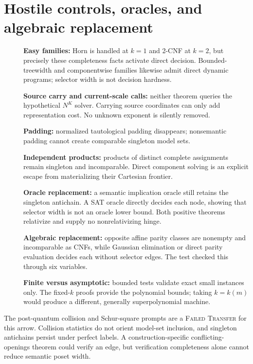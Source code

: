 \documentclass[11pt]{article}
\begin{document}
\section{Hostile controls, oracles, and algebraic replacement}
\begin{description}
\item[] \textbf{Easy families:} Horn is handled at $k=1$ and 2-CNF at
$k=2$, but precisely these completeness facts activate direct decision.
Bounded-treewidth and componentwise families likewise admit direct dynamic
programs; selector width is not decision hardness.
\item[] \textbf{Source carry and current-scale calls:} neither theorem
queries the hypothetical $N^K$ solver.  Carrying source coordinates can only
add representation cost.  No unknown exponent is silently removed.
\item[] \textbf{Padding:} normalized tautological padding disappears;
nonsemantic padding cannot create comparable singleton model sets.
\item[] \textbf{Independent products:} products of distinct complete
assignments remain singleton and incomparable.  Direct component solving is
an explicit escape from materializing their Cartesian frontier.
\item[] \textbf{Oracle replacement:} a semantic implication oracle still
retains the singleton antichain.  A SAT oracle directly decides each node,
showing that selector width is not an oracle lower bound.  Both positive
theorems relativize and supply no nonrelativizing hinge.
\item[] \textbf{Algebraic replacement:} opposite affine parity classes are
nonempty and incomparable as CNFs, while Gaussian elimination or direct
parity evaluation decides each without selector edges.  The test checked
this through six variables.
\item[] \textbf{Finite versus asymptotic:} bounded tests validate exact
small instances only.  The fixed-$k$ proofs provide the polynomial bounds;
taking $k=k(m)$ would produce a different, generally superpolynomial
machine.
\end{description}

The post-quantum collision and Schur-square prompts are a
\textsc{Failed Transfer} for this arrow.  Collision statistics do not orient
model-set inclusion, and singleton antichains persist under perfect labels.
A construction-specific conflicting-openings theorem could verify an edge,
but verification completeness alone cannot reduce semantic poset width.
\end{document}
